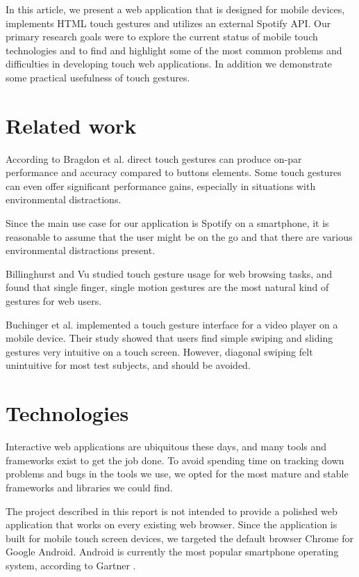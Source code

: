 \documentclass[conference]{IEEEtran}
\begin{document}
In this article, we present a web application that is designed for mobile devices, implements HTML touch gestures and utilizes an external Spotify API. Our primary research goals were to explore the current status of mobile touch technologies and to find and highlight some of the most common problems and difficulties in developing touch web applications. In addition we demonstrate some practical usefulness of touch gestures.


\section{Related work}

According to Bragdon et al. direct touch gestures can produce on-par performance and accuracy compared to buttons elements. Some touch gestures can even offer significant performance gains, especially in situations with environmental distractions.
\cite{BragdonExperimental}

Since the main use case for our application is Spotify on a smartphone, it is reasonable to assume that the user might be on the go and that there are various environmental distractions present.

Billinghurst and Vu studied touch gesture usage for web browsing tasks, and found that single finger, single motion gestures
are the most natural kind of gestures for web users.
\cite{BillinghurstGestures}

Buchinger et al. implemented a touch gesture interface for a video player on a mobile device.
Their study showed that users find simple swiping and sliding gestures very intuitive on a touch screen.
However, diagonal swiping felt unintuitive for most test subjects, and should be avoided.
\cite{GestureVideoPlayer}

\section{Technologies}
Interactive web applications are ubiquitous these days, and many tools and frameworks exist to get the job done.
To avoid spending time on tracking down problems and bugs in the tools we use, we opted for the most mature and stable frameworks and libraries we could find.

The project described in this report is not intended to provide a polished web application that works on every existing web browser.
Since the application is built for mobile touch screen devices, we targeted the default browser Chrome for Google Android.
Android is currently the most popular smartphone operating system, according to Gartner \cite{AndroidMarketShare}.
\end{document}
